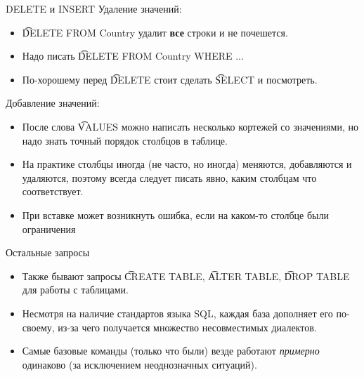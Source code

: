 \begin{frame}{DELETE и INSERT}
	Удаление значений:
	\begin{itemize}
		\item \t{DELETE FROM Country} удалит \textbf{все} строки и не почешется.
		\item Надо писать \t{DELETE FROM Country WHERE ...}
		\item По-хорошему перед \t{DELETE} стоит сделать \t{SELECT} и посмотреть.
	\end{itemize}
	Добавление значений:
	\begin{itemize}
		\item
			После слова \t{VALUES} можно написать несколько кортежей со значениями,
			но надо знать точный порядок столбцов в таблице.
		\item На практике столбцы иногда (не часто, но иногда) меняются, добавляются и удаляются,
			поэтому всегда следует писать явно, каким столбцам что соответствует.
		\item При вставке может возникнуть ошибка, если на каком-то столбце были ограничения
	\end{itemize}
\end{frame}

\begin{frame}{Остальные запросы}
	\begin{itemize}
		\item Также бывают запросы \t{CREATE TABLE}, \t{ALTER TABLE}, \t{DROP TABLE} для работы с таблицами.
		\item Несмотря на наличие стандартов языка SQL, каждая база дополняет его по-своему,
			из-за чего получается множество несовместимых диалектов.
		\item Самые базовые команды (только что были) везде работают \textit{примерно} одинаково
			(за исключением неоднозначных ситуаций).
	\end{itemize}
\end{frame}
